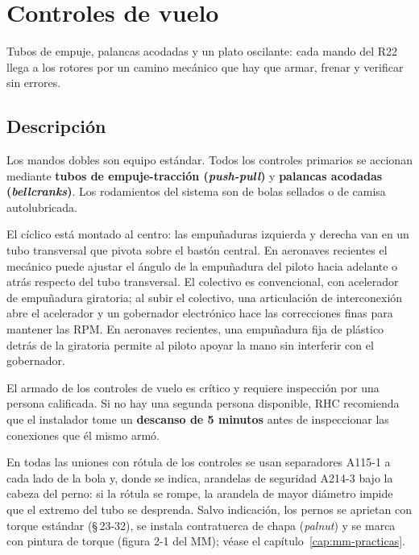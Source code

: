 \chapter{Controles de vuelo}
\label{cap:mm-controles}

\opening{Tubos de empuje, palancas acodadas y un plato oscilante: cada mando del R22 llega a los rotores por un camino mecánico que hay que armar, frenar y verificar sin errores.}

\section{Descripción}

Los mandos dobles son equipo estándar. Todos los controles primarios se accionan mediante \textbf{tubos de empuje-tracción (\emph{push-pull})} y \textbf{palancas acodadas (\emph{bellcranks})}. Los rodamientos del sistema son de bolas sellados o de camisa autolubricada.

El cíclico está montado al centro: las empuñaduras izquierda y derecha van en un tubo transversal que pivota sobre el bastón central. En aeronaves recientes el mecánico puede ajustar el ángulo de la empuñadura del piloto hacia adelante o atrás respecto del tubo transversal. El colectivo es convencional, con acelerador de empuñadura giratoria; al subir el colectivo, una articulación de interconexión abre el acelerador y un gobernador electrónico hace las correcciones finas para mantener las RPM. En aeronaves recientes, una empuñadura fija de plástico detrás de la giratoria permite al piloto apoyar la mano sin interferir con el gobernador.

\begin{advertencia}
El armado de los controles de vuelo es crítico y requiere inspección por una persona calificada. Si no hay una segunda persona disponible, RHC recomienda que el instalador tome un \textbf{descanso de 5 minutos} antes de inspeccionar las conexiones que él mismo armó.
\end{advertencia}

En todas las uniones con rótula de los controles se usan separadores A115-1 a cada lado de la bola y, donde se indica, arandelas de seguridad A214-3 bajo la cabeza del perno: si la rótula se rompe, la arandela de mayor diámetro impide que el extremo del tubo se desprenda. Salvo indicación, los pernos se aprietan con torque estándar (\S\,23-32), se instala contratuerca de chapa (\emph{palnut}) y se marca con pintura de torque (figura 2-1 del MM); véase el capítulo~\ref{cap:mm-practicas}.

